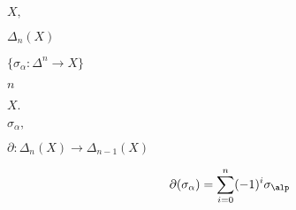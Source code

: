 \documentclass[10pt]{book}
\begin{document}
\begin{mdSnippets}
\begin{mdInlineSnippet}[412bd1def2f1b61da9169d88e6c8b9e9]%
$X,$\end{mdInlineSnippet}%
\begin{mdInlineSnippet}[cb1d7c6a00d98b1e446dcd1eb0201c8f]%
$\Delta_n(X)$\end{mdInlineSnippet}%
\begin{mdInlineSnippet}[89bc1cdfd5759e6ee0c66443646a4e33]%
$\{\sigma_\alpha: \Delta^n \to X\}$\end{mdInlineSnippet}%
\begin{mdInlineSnippet}[7b8b965ad4bca0e41ab51de7b31363a1]%
$n$\end{mdInlineSnippet}%
\begin{mdInlineSnippet}[3d2f9e254afe4be361f104d3748e8570]%
$X.$\end{mdInlineSnippet}%
\begin{mdInlineSnippet}%
$\sigma_\alpha,$\end{mdInlineSnippet}%
\begin{mdInlineSnippet}[9b0c9cc86a80b115fc56fe1f774bbc25]%
$\partial: \Delta_n(X) \to \Delta_{n-1}(X)$\end{mdInlineSnippet}%
\begin{mdDisplaySnippet}%
\[%
\partial(\sigma_\alpha) = \sum_{i=0}^n (-1)^i
  \sigma_\alp
\]%
\end{mdDisplaySnippet}%

\end{mdSnippets}
\end{document}
